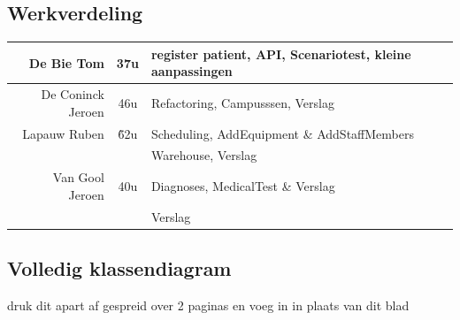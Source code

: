 \documentclass[a4paper]{article}
\begin{document}
\subsection{Werkverdeling} %
\begin{center}
\begin{tabular}{| r || c | l |}
\hline
De Bie Tom & 37u & register patient, API, Scenariotest, kleine aanpassingen \\
\hline
De Coninck Jeroen & 46u & Refactoring, Campusssen, Verslag \\
\hline
Lapauw Ruben & \~ 62u & Scheduling, AddEquipment \& AddStaffMembers \\
	     &		 & Warehouse, Verslag \\
\hline
Van Gool Jeroen & 40u & Diagnoses, MedicalTest \& Verslag \\ 
~ & ~ & Verslag \\
\hline
\end{tabular}
\end{center}
\newpage
\subsection{Volledig klassendiagram \label{sec:classdiagram}}
druk dit apart af gespreid over 2 paginas en voeg in in plaats van dit blad
\newpage
\end{document}
